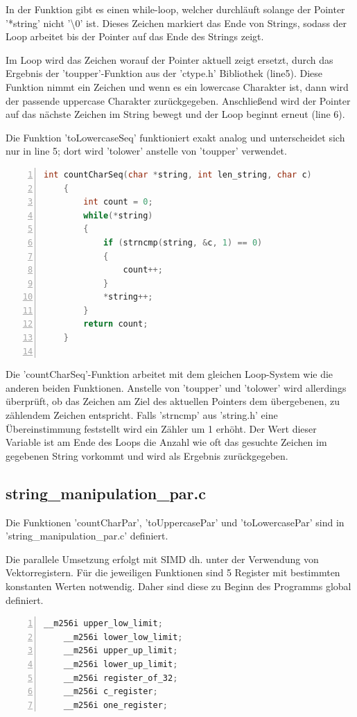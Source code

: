\documentclass[plainarticle,zihtitle,german,final,hyperref,utf8]{zihpub}
\begin{document}
In der Funktion gibt es einen while-loop, welcher durchläuft solange der Pointer 
 '{*}string' nicht '\textbackslash0' ist. Dieses Zeichen markiert das Ende von Strings, sodass der Loop arbeitet bis der Pointer auf das Ende des Strings zeigt.

Im Loop wird das Zeichen worauf der Pointer aktuell zeigt ersetzt, durch das Ergebnis der 'toupper'-Funktion aus der 'ctype.h' Bibliothek (line5). Diese Funktion nimmt ein Zeichen und wenn es ein lowercase Charakter ist, dann wird der passende uppercase Charakter zurückgegeben. Anschließend wird der Pointer auf das nächste Zeichen im String bewegt und der Loop beginnt erneut (line 6).

Die Funktion 'toLowercaseSeq' funktioniert exakt analog und unterscheidet sich nur in line 5; dort wird 'tolower' anstelle von 'toupper' verwendet.

\begin{lstlisting}[language=c, numbers=left]
	int countCharSeq(char *string, int len_string, char c)
	{
		int count = 0;
		while(*string)
		{
			if (strncmp(string, &c, 1) == 0)
			{
				count++;
			}
			*string++;
		}
		return count;
	}
	
\end{lstlisting}

Die 'countCharSeq'-Funktion arbeitet mit dem gleichen Loop-System wie die anderen beiden Funktionen. Anstelle von 'toupper' und 'tolower' wird allerdings überprüft, ob das Zeichen am Ziel des aktuellen Pointers dem übergebenen, zu zählendem Zeichen entspricht. Falls 'strncmp' aus 'string.h' eine Übereinstimmung feststellt wird ein Zähler um 1 erhöht. Der Wert dieser Variable ist am Ende des Loops die Anzahl wie oft das gesuchte Zeichen im gegebenen String vorkommt und wird als Ergebnis zurückgegeben.


\subsection{string\_manipulation\_par.c}\label{subsec:par}
Die Funktionen 'countCharPar', 'toUppercasePar' und 'toLowercasePar' sind in 'string\_manipulation\_par.c' definiert.

Die parallele Umsetzung erfolgt mit SIMD dh. unter der Verwendung von Vektorregistern. Für die jeweiligen Funktionen sind 5 Register mit bestimmten konstanten Werten notwendig. Daher sind diese zu Beginn des Programms global definiert.
\begin{lstlisting}[language=c, numbers=left]
	__m256i upper_low_limit;
	__m256i lower_low_limit;
	__m256i upper_up_limit;
	__m256i lower_up_limit;
	__m256i register_of_32;
	__m256i c_register;
	__m256i one_register;
\end{lstlisting}
\end{document}
